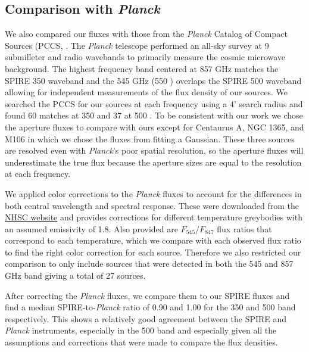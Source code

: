 \subsection{Comparison with \textit{Planck}}
We also compared our fluxes with those from the \textit{Planck} Catalog of Compact Sources (PCCS, \citet{Planck-Collaboration:2013rt}. The \textit{Planck} telescope performed an all-sky survey at 9 submilleter and radio wavebands to primarily measure the cosmic microwave background. The highest frequency band centered at 857 GHz matches the SPIRE 350 \um{} waveband and the 545 GHz (550 \um{}) overlaps the SPIRE 500 \um{} waveband allowing for independent measurements of the flux density of our sources. We searched the PCCS for our sources at each frequency using a 4' search radius and found 60 matches at 350 \um{} and 37 at 500 \um{}. To be consistent with our work we chose the aperture fluxes to compare with ours except for Centaurus A, NGC 1365, and M106 in which we chose the fluxes from fitting a Gaussian. These three sources are resolved even with \textit{Planck}'s poor spatial resolution, so the aperture fluxes will underestimate the true flux because the aperture sizes are equal to the resolution at each frequency. 

We applied color corrections to the \textit{Planck} fluxes to account for the differences in both central wavelength and spectral response. These were downloaded from the \href{https://nhscsci.ipac.caltech.edu/sc/index.php/Spire/PhotDataAnalysis}{NHSC website} and provides corrections for different temperature greybodies with an assumed emissivity of 1.8. Also provided are $F_{545}/F_{847}$ flux ratios that correspond to each temperature, which we compare with each observed flux ratio to find the right color correction for each source. Therefore we also restricted our comparison to only include sources that were detected in both the 545 and 857 GHz band giving a total of 27 sources. 

After correcting the \textit{Planck} fluxes, we compare them to our SPIRE fluxes and find a median SPIRE-to-\textit{Planck} ratio of 0.90 and 1.00 for the 350 and 500 \um{} band respectively. This shows a relatively good agreement between the SPIRE and \textit{Planck} instruments, especially in the 500 \um{} band and especially given all the assumptions and corrections that were made to compare the flux densities.
  
  
